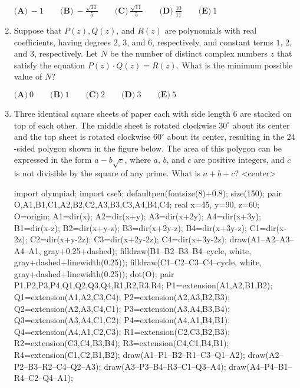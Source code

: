 \documentclass{article}
\begin{document}
\begin{enumerate}[label=\arabic*., itemsep=0.5em]
\(\textbf{(A)}\ {-}1 \qquad\textbf{(B)}\ {-}\frac{\sqrt{11}}{5} \qquad\textbf{(C)}\ \frac{\sqrt{11}}{5} \qquad\textbf{(D)}\
\frac{10}{11} \qquad\textbf{(E)}\ 1\)\par \vspace{0.5em}\item Suppose that \(P(z), Q(z)\), and \(R(z)\) are polynomials with real coefficients, having degrees \(2\), \(3\), and \(6\), respectively, and constant terms \(1\), \(2\), and \(3\), respectively. Let \(N\) be the number of distinct complex numbers \(z\) that satisfy the equation \(P(z) \cdot Q(z)=R(z)\). What is the minimum possible value of \(N\)?

\(\textbf{(A)}\: 0\qquad\textbf{(B)} \: 1\qquad\textbf{(C)} \: 2\qquad\textbf{(D)} \: 3\qquad\textbf{(E)} \: 5\)\par \vspace{0.5em}\item Three identical square sheets of paper each with side length \(6\) are stacked on top of each other. The middle sheet is rotated clockwise \(30^\circ\) about its center and the top sheet is rotated clockwise \(60^\circ\) about its center, resulting in the \(24\)-sided polygon shown in the figure below. The area of this polygon can be expressed in the form \(a-b\sqrt{c}\), where \(a\), \(b\), and \(c\) are positive integers, and \(c\) is not divisible by the square of any prime. What is \(a+b+c\)?
<center>
\begin{center}
\begin{asy}
import olympiad;
import cse5;
defaultpen(fontsize(8)+0.8); size(150);
pair O,A1,B1,C1,A2,B2,C2,A3,B3,C3,A4,B4,C4;
real x=45, y=90, z=60; O=origin; 
A1=dir(x); A2=dir(x+y); A3=dir(x+2y); A4=dir(x+3y);
B1=dir(x-z); B2=dir(x+y-z); B3=dir(x+2y-z); B4=dir(x+3y-z);
C1=dir(x-2z); C2=dir(x+y-2z); C3=dir(x+2y-2z); C4=dir(x+3y-2z);
draw(A1--A2--A3--A4--A1, gray+0.25+dashed);
filldraw(B1--B2--B3--B4--cycle, white, gray+dashed+linewidth(0.25));
filldraw(C1--C2--C3--C4--cycle, white, gray+dashed+linewidth(0.25));
dot(O);
pair P1,P2,P3,P4,Q1,Q2,Q3,Q4,R1,R2,R3,R4;
P1=extension(A1,A2,B1,B2); Q1=extension(A1,A2,C3,C4); 
P2=extension(A2,A3,B2,B3); Q2=extension(A2,A3,C4,C1); 
P3=extension(A3,A4,B3,B4); Q3=extension(A3,A4,C1,C2); 
P4=extension(A4,A1,B4,B1); Q4=extension(A4,A1,C2,C3); 
R1=extension(C2,C3,B2,B3); R2=extension(C3,C4,B3,B4); 
R3=extension(C4,C1,B4,B1); R4=extension(C1,C2,B1,B2);
draw(A1--P1--B2--R1--C3--Q1--A2);
draw(A2--P2--B3--R2--C4--Q2--A3);
draw(A3--P3--B4--R3--C1--Q3--A4);
draw(A4--P4--B1--R4--C2--Q4--A1);
\end{asy}

\end{center}
\end{enumerate}
\end{document}
